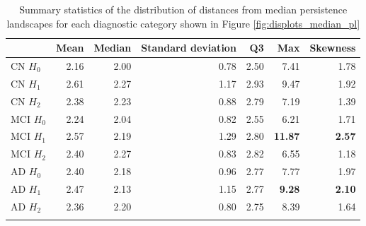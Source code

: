 \documentclass{article}
\begin{document}
\begin{table}
\centering
\begin{tabular}{lrrrrrr}
\toprule
{} &  Mean &  Median &  Standard deviation &   Q3 &   Max &  Skewness \\
\midrule
CN $H_0$ & 2.16 & 2.00 & 0.78 & 2.50 & 7.41 & 1.78 \\
CN $H_1$ & 2.61 & 2.27 & 1.17 & 2.93 & 9.47 & 1.92 \\
CN $H_2$ & 2.38 & 2.23 & 0.88 & 2.79 & 7.19 & 1.39 \\
MCI $H_0$ & 2.24 & 2.04 & 0.82 & 2.55 & 6.21 & 1.71 \\
MCI $H_1$ & 2.57 & 2.19 & 1.29 & 2.80 & \textbf{11.87} & \textbf{2.57} \\
MCI $H_2$ & 2.40 & 2.27 & 0.83 & 2.82 & 6.55 & 1.18 \\
AD $H_0$ & 2.40 & 2.18 & 0.96 & 2.77 & 7.77 & 1.97 \\
AD $H_1$ & 2.47 & 2.13 & 1.15 & 2.77 & \textbf{9.28} & \textbf{2.10} \\
AD $H_2$ & 2.36 & 2.20 & 0.80 & 2.75 & 8.39 & 1.64 \\
  \bottomrule
  \vspace{1pt}
\end{tabular}
\caption{Summary statistics of the distribution of distances from median persistence landscapes for each diagnostic category shown in Figure \ref{fig:displots_median_pl}}
\label{tab:stats_median_pl}
\end{table}
\end{document}

